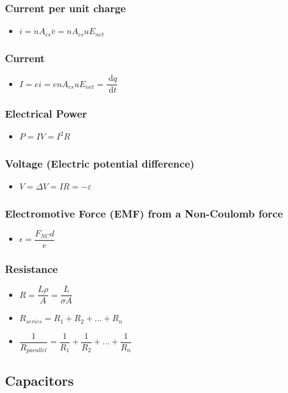 \documentclass[]{report}
\newcommand \tab[1][1cm]{\hspace*{#1}}
\newcommand{\dn}[1]{\ \mathrm{d}#1}
\newcommand{\dd}[2]{ \dfrac{\dn #1}{\dn #2}}
\newcommand{\itemt}{\item \tab}
\begin{document}
\subsubsection{Current per unit charge}
\begin{itemize}
\itemt \(i = nA_{cs}\bar{v} = nA_{cs}uE_{net}\)
\end{itemize}

\subsubsection{Current}
\begin{itemize}
\itemt \( I = ei = enA_{cs}uE_{net} = \dd{q}{t}\)
\end{itemize}	

\subsubsection{Electrical Power}
\begin{itemize}
\itemt \( P = IV = I^2R \)
\end{itemize}

\subsubsection{Voltage (Electric potential difference)}
\begin{itemize}
\itemt \( V = \Delta V = IR = - \varepsilon \)
\end{itemize}

\subsubsection{Electromotive Force (EMF) from a Non-Coulomb force}
\begin{itemize}
\itemt \( \epsilon = \dfrac{F_{NC}d}{e} \)
\end{itemize}

\subsubsection{Resistance}
\begin{itemize}
\itemt \( R = \dfrac{L\rho}{A} = \dfrac{L}{\sigma A} \)					
\itemt \( R_{series} = R_1 + R_2 + ... +R_n \)
\itemt \( \dfrac{1}{R_{parallel}} = \dfrac{1}{R_1} + \dfrac{1}{R_2} + ... + \dfrac{1}{R_n} \)
\end{itemize}

		\subsection{Capacitors}
\end{document}
